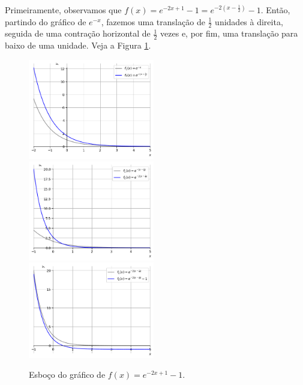 \begin{resol}
  Primeiramente, observamos que $f(x) = e^{-2x+1}-1 = e^{-2\left(x-\frac{1}{2}\right)}-1$. Então, partindo do gráfico de $e^{-x}$, fazemos uma translação de $\frac{1}{2}$ unidades à direita, seguida de uma contração horizontal de $\frac{1}{2}$ vezes e, por fim, uma translação para baixo de uma unidade. Veja a Figura \ref{fig:exeresol_funexp_graf}.

  \begin{figure}[H]
    \centering
    \includegraphics[width=0.49\textwidth]{./cap_funcao/dados/fig_exeresol_funexp_graf/fig_exeresol_funexp_graf_1}~
    \includegraphics[width=0.49\textwidth]{./cap_funcao/dados/fig_exeresol_funexp_graf/fig_exeresol_funexp_graf_2}\\
    \includegraphics[width=0.49\textwidth]{./cap_funcao/dados/fig_exeresol_funexp_graf/fig_exeresol_funexp_graf_3}
    \caption{Esboço do gráfico de $f(x) = e^{-2x+1}-1$.}
    \label{fig:exeresol_funexp_graf}
  \end{figure}
\end{resol}

